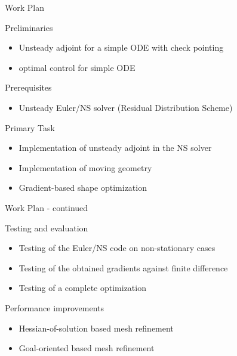 \begin{frame}{Work Plan}

\begin{block}{Preliminaries}
\begin{itemize}\item Unsteady adjoint for a simple ODE with check pointing
\item optimal control for simple ODE
\end{itemize}
\end{block}
\pause
\begin{block}{Prerequisites}
\begin{itemize}
\item Unsteady Euler/NS solver (Residual Distribution Scheme)
\end{itemize}
\end{block}
\pause
\begin{block}{Primary Task}
\begin{itemize}
\item Implementation of unsteady adjoint in the NS solver
\item Implementation of moving geometry
\item Gradient-based shape optimization
\end{itemize}
\end{block}

\end{frame}

\begin{frame}{Work Plan - continued}
\begin{block}{Testing and evaluation}
\begin{itemize}
\item Testing of the Euler/NS code on non-stationary cases
\item Testing of the obtained gradients against finite difference
\item Testing of a complete optimization
\end{itemize}
\end{block}
\begin{block}{Performance improvements}
\begin{itemize}
\item Hessian-of-solution based mesh refinement
\item Goal-oriented based mesh refinement
\end{itemize}
\end{block}
\end{frame}


